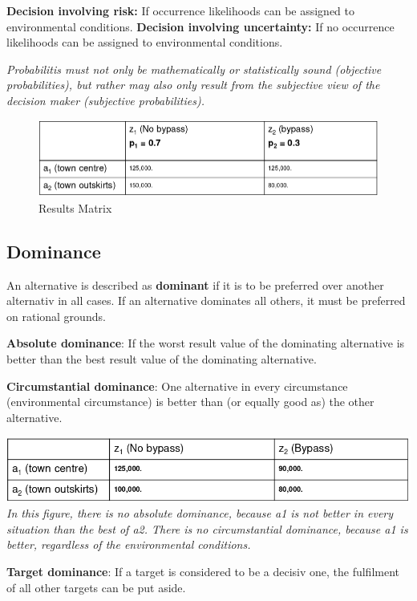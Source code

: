 \textbf{Decision involving risk:} If occurrence likelihoods can be
assigned to environmental conditions. \textbf{Decision involving
uncertainty:} If no occurrence likelihoods can be assigned to
environmental conditions.

\emph{Probabilitis must not only be mathematically or statistically
sound (objective probabilities), but rather may also only result from
the subjective view of the decision maker (subjective probabilities).}

\begin{figure}
\centering
\includegraphics{figures/resultMatrix2.png}
\caption{Results Matrix}
\end{figure}

\hypertarget{dominance}{%
\subsection{Dominance}\label{dominance}}

An alternative is described as \textbf{dominant} if it is to be
preferred over another alternativ in all cases. If an alternative
dominates all others, it must be preferred on rational grounds.

\textbf{Absolute dominance}: If the worst result value of the dominating
alternative is better than the best result value of the dominating
alternative.

\textbf{Circumstantial dominance}: One alternative in every circumstance
(environmental circumstance) is better than (or equally good as) the
other alternative.

\includegraphics{figures/absoluteDominance.png} \emph{In this figure,
there is no absolute dominance, because a1 is not better in every
situation than the best of a2. There is no circumstantial dominance,
because a1 is better, regardless of the environmental conditions.}

\textbf{Target dominance}: If a target is considered to be a decisiv
one, the fulfilment of all other targets can be put aside.

